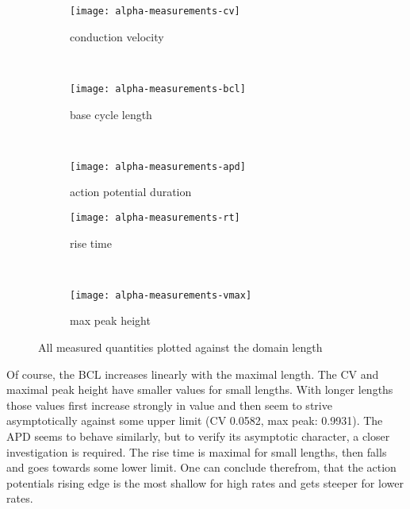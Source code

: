 \begin{figure}[h]
    \centering
    \begin{subfigure}[b]{.3\textwidth}
        \texttt{[image: alpha-measurements-cv]}
        \vspace{-\baselineskip}
        \caption{conduction velocity}
        \label{fig:alpha-measure-cv}
    \end{subfigure}
    \vspace{\baselineskip}
    ~
    \begin{subfigure}[b]{.3\textwidth}
        \texttt{[image: alpha-measurements-bcl]}
        \vspace{-\baselineskip}
        \caption{base cycle length}
        \label{fig:alpha-measure-bcl}
    \end{subfigure}
    ~
    \begin{subfigure}[b]{.3\textwidth}
        \texttt{[image: alpha-measurements-apd]}
        \vspace{-\baselineskip}
        \caption{action potential duration}
        \label{fig:alpha-measure-apd}
    \end{subfigure}
    \begin{subfigure}[b]{.3\textwidth}
        \texttt{[image: alpha-measurements-rt]}
        \vspace{-\baselineskip}
        \caption{rise time}
        \label{fig:alpha-measure-rt}
    \end{subfigure}
    ~
    \begin{subfigure}[b]{.3\textwidth}
        \texttt{[image: alpha-measurements-vmax]}
        \vspace{-\baselineskip}
        \caption{max peak height}
        \label{fig:alpha-measure-vmax}
    \end{subfigure}
    \caption{All measured quantities plotted against the domain length}
    \label{fig:alpha2}
\end{figure}

Of course, the BCL increases linearly with the maximal length.  The CV and
maximal peak height have smaller values for small lengths. With longer lengths
those values first increase strongly in value and then seem to strive
asymptotically against some upper limit (CV 0.0582, max peak: 0.9931).  The APD
seems to behave similarly, but to verify its asymptotic character, a closer
investigation is required.  The rise time is maximal for small lengths, then
falls and goes towards some lower limit. One can conclude therefrom, that the
action potentials rising edge is the most shallow for high rates and gets
steeper for lower rates.

